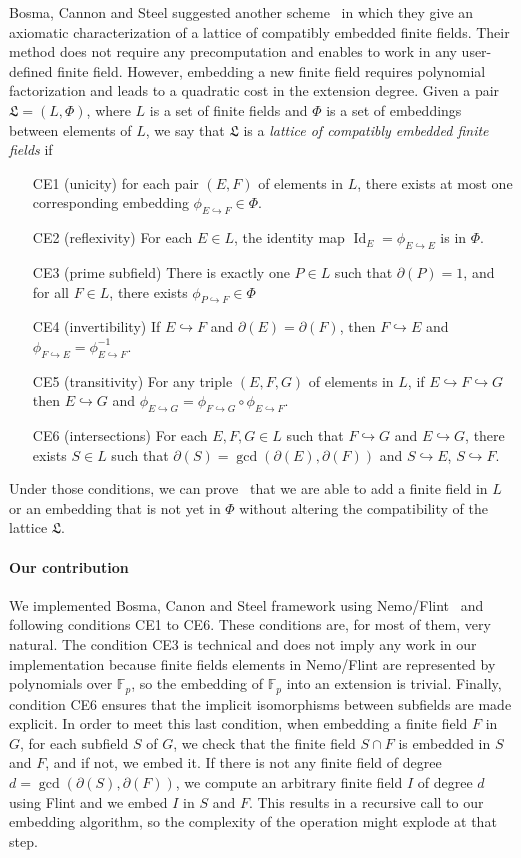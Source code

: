 \documentclass[12pt]{article}
\DeclareMathOperator{\Id}{Id}
\newcommand{\dE}{\partial(E)}
\newcommand{\dF}{\partial(F)}
\newcommand{\emb}{\hookrightarrow}
\newcommand{\embed}[2]{\phi_{#1\hookrightarrow#2}}
\begin{document}
Bosma, Cannon and Steel suggested another scheme~\cite{BCS97} in which they
give an axiomatic characterization of a lattice of compatibly embedded finite
fields. Their method does not require any precomputation and enables to work in
any user-defined finite field. However, embedding a new finite field requires
polynomial factorization and leads to a quadratic cost in the extension degree.
Given a pair $\mathfrak L=(L, \Phi)$, where
$L$ is a set of finite fields and $\Phi$ is a set of embeddings between
elements of $L$, we say that $\mathfrak L$ is a \emph{lattice of compatibly
embedded finite fields} if
\begin{enumerate}
  \item[CE1] (unicity) for each pair $(E, F)$ of elements in $L$, there exists
    at most one corresponding embedding $\embed{E}{F}\in\Phi$.
  \item[CE2] (reflexivity) For each $E\in L$, the identity map
    $\Id_E=\embed{E}{E}$ is in $\Phi$.
  \item[CE3] (prime subfield) There is exactly one $P\in L$ such that $\partial
    (P) = 1$, and for all $F\in L$, there exists $\embed{P}{F}\in\Phi$
  \item[CE4] (invertibility) If $E\emb F$ and $\dE=\dF$, then $F\emb E$ and
    $\embed{F}{E}=\embed{E}{F}^{-1}$.
  \item[CE5] (transitivity) For any triple $(E, F, G)$ of elements in $L$, if $E\emb
    F\emb G$ then $E\emb G$ and
    $\embed{E}{G}=\embed{F}{G}\circ\embed{E}{F}$.
  \item[CE6](intersections) For each $E, F, G\in L$ such that $F\emb G$ and
    $E\emb G$, there exists $S\in L$ such that $\partial(S)=\gcd(\dE, \dF)$
    and $S\emb E$, $S\emb F$.
\end{enumerate}

Under those conditions, we can prove~\cite{BCS97} that we are able to add a
finite field in
$L$ or an embedding that is not yet in $\Phi$ without altering the compatibility
of the lattice $\mathfrak L$.

\paragraph{Our contribution}

We implemented Bosma, Canon and Steel framework using Nemo/Flint~\cite{Nemo,
Flint} and following conditions CE1 to CE6. These
conditions are, for most of them, very natural. The condition CE3 is
technical and does not imply any work in our implementation because
finite fields elements in Nemo/Flint are represented by
polynomials over $\mathbb{F}_p$, so the embedding of $\mathbb{F}_p$ into an
extension is trivial. Finally, condition
CE6 ensures that the implicit isomorphisms between subfields are made
explicit. In order to meet this last condition, when embedding a finite field
$F$ in $G$, for each subfield $S$ of $G$, we check that the finite field $S\cap F$ is 
embedded in $S$ and $F$, and if not, we embed it. If there is not
any finite field of degree $d=\gcd(\partial(S), \dF)$, we compute an
arbitrary finite field $I$ of degree $d$ using Flint
and we embed $I$ in $S$ and $F$. This results in a recursive call to our
embedding algorithm, so the complexity of the operation might explode at that step.
\end{document}
